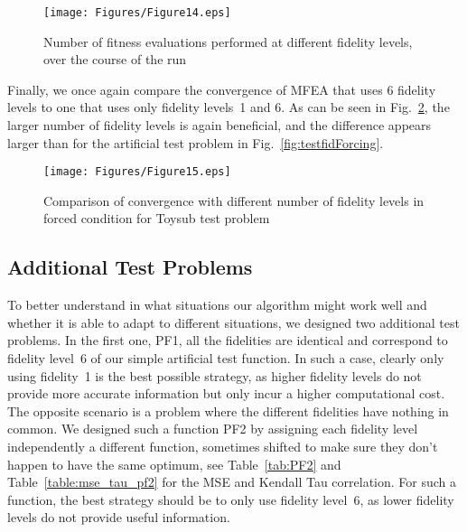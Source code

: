 \begin{figure}[!htb]
	\centering
	\texttt{[image: Figures/Figure14.eps]}
	\caption{Number of fitness evaluations performed at different fidelity levels, over the course of the run}
	\label{fig:evals}
\end{figure} 

Finally, we once again compare the convergence of MFEA that uses 6 fidelity levels to one that uses only fidelity levels~1 and 6. As can be seen in Fig.~\ref{fig:toysubfidForcing}, the larger number of fidelity levels is again beneficial, and the difference appears larger than for the artificial test problem in Fig.~\ref{fig:testfidForcing}.

\begin{figure}[!htb]
	\centering
	\texttt{[image: Figures/Figure15.eps]}
	\caption{Comparison of convergence with different number of fidelity levels in forced condition for Toysub test problem}
	\label{fig:toysubfidForcing}
\end{figure}



\subsection{Additional Test Problems}
To better understand in what situations our algorithm might work well and whether it is able to adapt to different situations, we designed two additional test problems. In the first one, PF1, all the fidelities are identical and correspond to fidelity level~6 of our simple artificial test function. In such a case, clearly only using fidelity~1 is the best possible strategy, as higher fidelity levels do not provide more accurate information but only incur a higher computational cost. The opposite scenario is a problem where the different fidelities have nothing in common. We designed such a function PF2 by assigning each fidelity level independently a different function, sometimes shifted to make sure they don't happen to have the same optimum, see Table~\ref{tab:PF2} and Table~\ref{table:mse_tau_pf2} for the MSE and Kendall Tau correlation. For such a function, the best strategy should be to only use fidelity level~6, as lower fidelity levels do not provide useful information.



